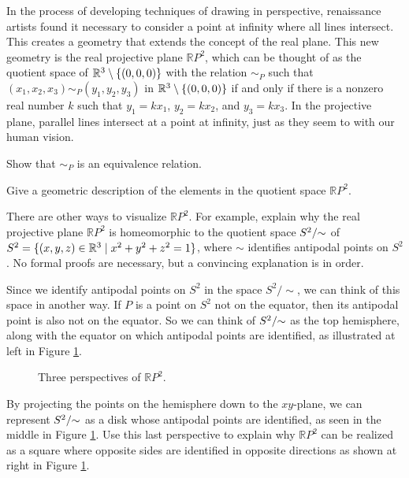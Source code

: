 \item In the process of developing techniques of drawing in perspective, renaissance artists found it necessary to consider a point at infinity where all lines intersect. This creates a geometry that extends the concept of the real plane. This new geometry is the real projective plane $\mathbb{R}P^2$, which can be thought of as the quotient space of $\mathbb{R}^3 \setminus \{(0,0,0)\}$ with the relation $\sim_P$ such that $(x_1,x_2,x_3) \sim_P (y_1,y_2,y_3)$ in $\mathbb{R}^3 \setminus \{(0,0,0)\}$ if and only if there is a nonzero real number $k$ such that $y_1 = kx_1$, $y_2 = kx_2$, and $y_3 = kx_3$.  In the projective plane, parallel lines intersect at a point at infinity, just as they seem to with our human vision. 

\ba

\item Show that $\sim_P$ is an equivalence relation.

\item Give a geometric description of the elements in the quotient space $\mathbb{R}P^2$.  

\item There are other ways to visualize $\mathbb{R}P^2$. For example, explain why the real projective plane $\mathbb{R}P^2$ is homeomorphic to the quotient space $S^2/\hspace{-1mm}\sim$ of $S^2 = \{(x,y,z) \in \mathbb{R}^3 \mid x^2+y^2+z^2 = 1\}$, where $\sim$ identifies antipodal points on $S^2$. No formal proofs are necessary, but a convincing explanation is in order.

\item Since we identify antipodal points on $S^2$ in the space $S^2/\sim$, we can think of this space in another way. If $P$ is a point on $S^2$ not on the equator, then its antipodal point is also not on the equator. So we can think of $S^2/\hspace{-1mm}\sim$ as the top hemisphere, along with the equator on which antipodal points are identified, as illustrated at left in Figure \ref{F:projective_1}. 
\begin{center}
\begin{figure}[h]
\begin{center}
 \hspace{0.25in}  \hspace{0.25in} 
\caption{Three perspectives of $\mathbb{R}P^2$.} 
\label{F:projective_1}
\end{center}
\end{figure}
\end{center}
By projecting the points on the hemisphere down to the $xy$-plane, we can represent $S^2/\hspace{-1mm}\sim$ as a disk whose antipodal points are identified, as seen in the middle in Figure \ref{F:projective_1}. Use this last perspective to explain why $\mathbb{R}P^2$ can be realized as a square where opposite sides are identified in opposite directions as shown at right in Figure \ref{F:projective_1}.

